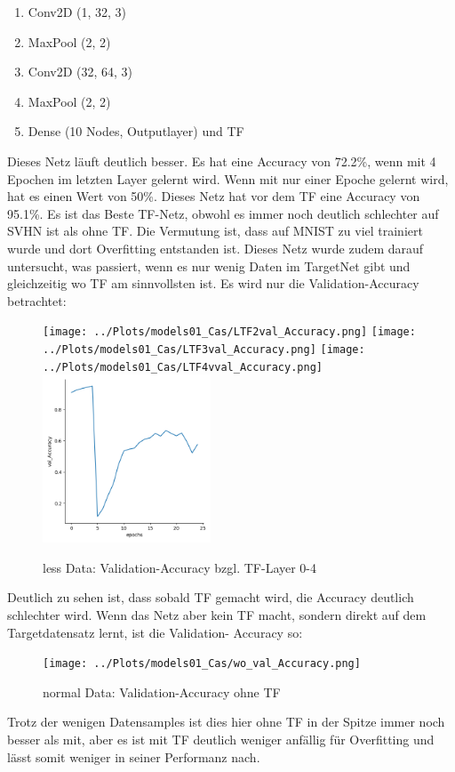     \begin{enumerate}
        \item Conv2D (1, 32, 3)
        \item MaxPool (2, 2)
        \item Conv2D (32, 64, 3)
        \item MaxPool (2, 2)
        \item Dense (10 Nodes, Outputlayer) und TF
    \end{enumerate}
    Dieses Netz läuft deutlich besser. Es hat eine Accuracy von 72.2\%, wenn mit 4 Epochen im 
    letzten Layer gelernt wird. Wenn mit nur einer Epoche gelernt wird, hat es einen Wert von 
    50\%. 
    Dieses Netz hat vor dem TF eine Accuracy von 95.1\%. Es ist das Beste TF-Netz, obwohl es 
    immer noch deutlich schlechter auf SVHN ist als ohne TF. Die Vermutung ist, dass auf MNIST 
    zu viel trainiert wurde und dort Overfitting entstanden ist. Dieses Netz wurde zudem darauf 
    untersucht, was passiert, wenn es nur wenig Daten im TargetNet gibt und gleichzeitig wo TF am 
    sinnvollsten ist. Es wird nur die Validation-Accuracy betrachtet: 
    \begin{figure}[htpb]
        \texttt{[image: ../Plots/models01\_Cas/LTF2val\_Accuracy.png]}
        \texttt{[image: ../Plots/models01\_Cas/LTF3val\_Accuracy.png]}
        \texttt{[image: ../Plots/models01\_Cas/LTF4vval\_Accuracy.png]}
        \includegraphics[height=5cm]{../Plots/models01_Cas/Lval_Accuracy.png}
        \caption{\label{fig:figure1} less Data: Validation-Accuracy bzgl. TF-Layer 0-4}
    \end{figure}

    Deutlich zu sehen ist, dass sobald TF gemacht wird, die Accuracy deutlich schlechter wird. 
    Wenn das Netz aber kein TF macht, sondern direkt auf dem Targetdatensatz lernt, ist die Validation-
    Accuracy so: 
    \begin{figure}[htpb]
        \texttt{[image: ../Plots/models01\_Cas/wo\_val\_Accuracy.png]}
        \caption{\label{fig:figure2} normal Data: Validation-Accuracy ohne TF}
    \end{figure}
    Trotz der wenigen Datensamples ist dies hier ohne TF in der Spitze immer noch besser als mit, 
    aber es ist mit TF deutlich weniger anfällig für Overfitting und lässt somit weniger in seiner 
    Performanz nach.


